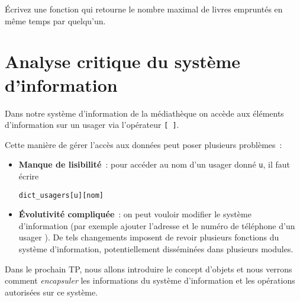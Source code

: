 \documentclass[10pt,a4paper]{sujets-exercices}
\begin{document}

Écrivez une fonction qui retourne le nombre maximal de livres empruntés en même temps par quelqu'un.


\section{Analyse critique du système d'information}

Dans notre système d'information de la médiathèque on accède aux éléments d'information sur un usager via l'opérateur \verb![ ]!. 

Cette manière de gérer l'accès aux données peut poser plusieurs problèmes~:

\begin{itemize}
\item \textbf{Manque de lisibilité}~: pour accéder au nom d'un usager donné \texttt{u}, il faut écrire 
\begin{center}
	\texttt{dict\_usagers[u][nom]}
\end{center}
\item \textbf{Évolutivité compliquée}~: on peut vouloir modifier le système d'information (par exemple ajouter l'adresse et le numéro de téléphone d'un usager ). De tels changements imposent de revoir plusieurs fonctions du système d'information, potentiellement disséminées dans plusieurs modules.
\end{itemize}

Dans le prochain TP, nous allons introduire le concept d'objets et nous verrons comment \emph{encapsuler} les informations du système d'information et les opérations autorisées sur ce système.
\end{document}
